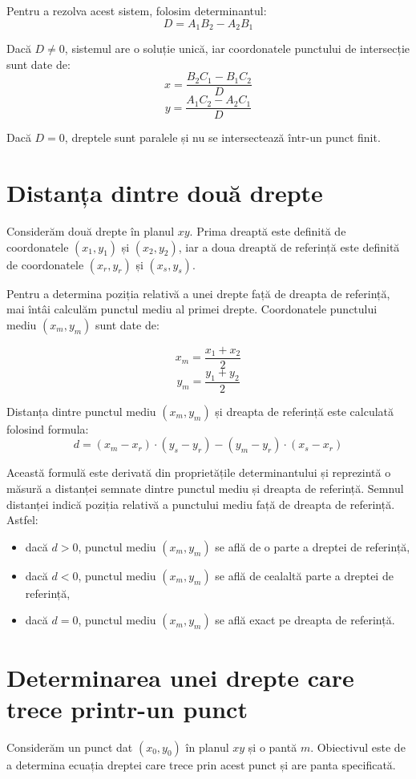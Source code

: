 \documentclass[a4paper,12pt]{report}
\begin{document}
Pentru a rezolva acest sistem, folosim determinantul:
\[
    D = A_1 B_2 - A_2 B_1
\]

Dacă $D \neq 0$, sistemul are o soluție unică, iar coordonatele punctului de intersecție sunt date de:
\[
    x = \frac{B_2 C_1 - B_1 C_2}{D}
\]
\[
    y = \frac{A_1 C_2 - A_2 C_1}{D}
\]

Dacă $D = 0$, dreptele sunt paralele și nu se intersectează într-un punct finit.

\section{Distanța dintre două drepte}
Considerăm două drepte în planul $xy$. Prima dreaptă este definită de coordonatele $(x_1, y_1)$ și $(x_2, y_2)$, iar a doua dreaptă de referință este definită de coordonatele $(x_r, y_r)$ și $(x_s, y_s)$.

Pentru a determina poziția relativă a unei drepte față de dreapta de referință, mai întâi calculăm punctul mediu al primei drepte. Coordonatele punctului mediu $(x_m, y_m)$ sunt date de:

\[
    x_m = \frac{x_1 + x_2}{2}
\]
\[
    y_m = \frac{y_1 + y_2}{2}
\]

Distanța dintre punctul mediu $(x_m, y_m)$ și dreapta de referință este calculată folosind formula:
\[
    d = (x_m - x_r) \cdot (y_s - y_r) - (y_m - y_r) \cdot (x_s - x_r)
\]

Această formulă este derivată din proprietățile determinantului și reprezintă o măsură a distanței semnate dintre punctul mediu și dreapta de referință. Semnul distanței indică poziția relativă a punctului mediu față de dreapta de referință. Astfel:
\begin{itemize}
    \item dacă $d > 0$, punctul mediu $(x_m, y_m)$ se află de o parte a dreptei de referință,
    \item  dacă $d < 0$, punctul mediu $(x_m, y_m)$ se află de cealaltă parte a dreptei de referință,
    \item  dacă $d = 0$, punctul mediu $(x_m, y_m)$ se află exact pe dreapta de referință.
\end{itemize}

\section{Determinarea unei drepte care trece printr-un punct}
Considerăm un punct dat $(x_0, y_0)$ în planul $xy$ și o pantă $m$. Obiectivul este de a determina ecuația dreptei care trece prin acest punct și are panta specificată.
\end{document}
